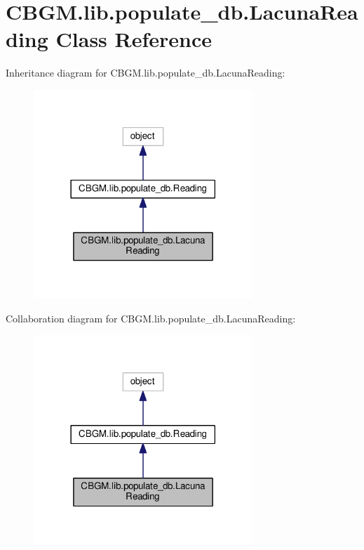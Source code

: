 \hypertarget{classCBGM_1_1lib_1_1populate__db_1_1LacunaReading}{}\section{C\+B\+G\+M.\+lib.\+populate\+\_\+db.\+Lacuna\+Reading Class Reference}
\label{classCBGM_1_1lib_1_1populate__db_1_1LacunaReading}


Inheritance diagram for C\+B\+G\+M.\+lib.\+populate\+\_\+db.\+Lacuna\+Reading\+:
\nopagebreak
\begin{figure}[H]
\begin{center}
\leavevmode
\includegraphics[width=234pt]{classCBGM_1_1lib_1_1populate__db_1_1LacunaReading__inherit__graph}
\end{center}
\end{figure}


Collaboration diagram for C\+B\+G\+M.\+lib.\+populate\+\_\+db.\+Lacuna\+Reading\+:
\nopagebreak
\begin{figure}[H]
\begin{center}
\leavevmode
\includegraphics[width=234pt]{classCBGM_1_1lib_1_1populate__db_1_1LacunaReading__coll__graph}
\end{center}
\end{figure}
